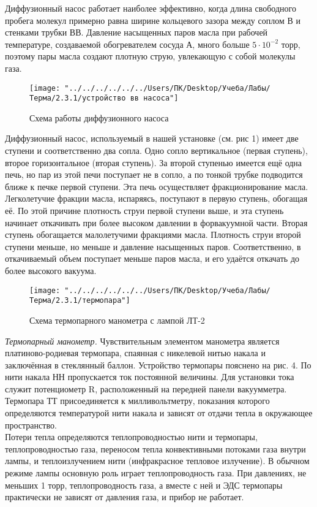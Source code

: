 \documentclass[12pt,a4paper]{article}
\begin{document}
Диффузионный насос работает наиболее эффективно, когда длина свободного пробега молекул примерно равна ширине кольцевого зазора между соплом В и стенками трубки ВВ. Давление насыщенных паров масла при рабочей температуре, создаваемой обогревателем сосуда А, много больше $5\cdot 10^{-2}$ торр, поэтому пары масла создают плотную струю, увлекающую с собой молекулы газа.
\begin{figure}[!h]
	\centering
	\texttt{[image: "../../../../../../Users/ПК/Desktop/Учеба/Лабы/Терма/2.3.1/устройство вв насоса"]}
	\caption[]{Схема работы диффузионного насоса}
	\label{fig:Схема ВВ насоса}
\end{figure}
 Диффузионный насос, используемый в нашей установке (см. рис 1) имеет две ступени и соответственно два сопла. Одно сопло вертикальное (первая ступень), второе горизонтальное (вторая ступень). За второй ступенью имеется ещё одна печь, но пар из этой печи поступает не в сопло, а по тонкой трубке подводится ближе к печке первой ступени. Эта печь осуществляет фракционирование масла. Легколетучие фракции масла, испаряясь, поступают в первую ступень, обогащая её. По этой причине плотность струи первой ступени выше, и эта ступень начинает откачивать при более высоком давлении в форвакуумной части. Вторая ступень обогащается малолетучими фракциями масла. Плотность струи второй ступени меньше, но меньше и давление насыщенных паров. Соответственно, в откачиваемый объем поступает меньше паров масла, и его удаётся откачать до более высокого вакуума.  \\
 \begin{wrapfigure}{r}{50mm}
 	\begin{center}
 		\texttt{[image: "../../../../../../Users/ПК/Desktop/Учеба/Лабы/Терма/2.3.1/термопара"]}
 		\caption{Схема термопарного манометра с лампой ЛТ-2}
 		\label{fig:Схема термопары}
 	\end{center}
 \end{wrapfigure}
 \textit{Термопарный манометр.} Чувствительным элементом манометра является платиново-родиевая термопара, спаянная с никелевой нитью накала и заключённая в стеклянный баллон. Устройство термопары пояснено на рис. 4. По нити накала НН пропускается ток постоянной величины. Для установки тока служит потенциометр R, расположенный на передней панели вакуумметра. Термопара ТТ присоединяется к милливольтметру, показания которого определяются температурой нити накала и зависят от отдачи тепла в окружающее пространство. \\
 Потери тепла определяются теплопроводностью нити и термопары, теплопроводностью газа, переносом тепла конвективными потоками газа внутри лампы, и теплоизлучением нити (инфракрасное тепловое излучение). В обычном режиме лампы основную роль играет теплопроводность газа. При давлениях, не меньших 1 торр, теплопроводность газа, а вместе с ней и ЭДС термопары практически не зависят от давления газа, и прибор не работает. \\
\end{document}
